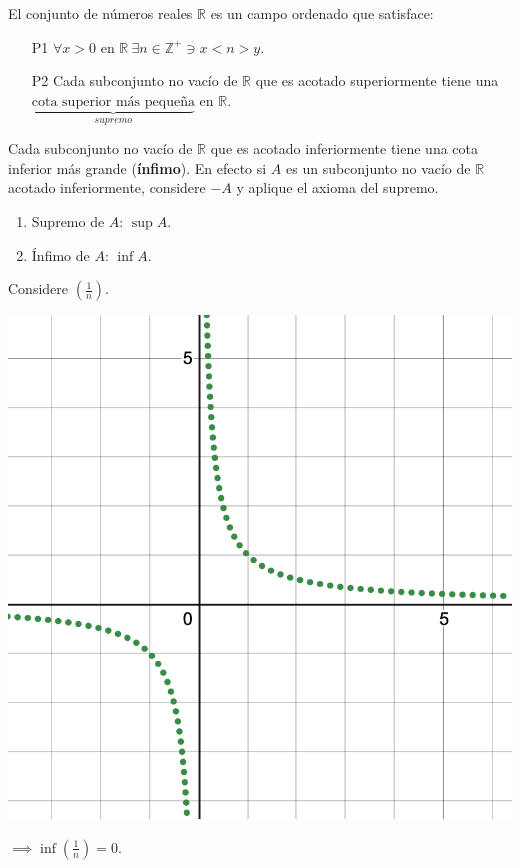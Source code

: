 \begin{definicion}
	El conjunto de números reales $\mathbb{R}$ es un campo ordenado que satisface: 
	\begin{enumerate}
		\item[P1] $\forall x>0$ en $\mathbb{R}\ \exists n \in \mathbb{Z}^+ \ni x<n>y$.
		\item[P2] Cada subconjunto no vacío de $\mathbb{R}$ que es acotado superiormente tiene una $\underbrace{\text{cota superior más pequeña}}_{supremo}$ en $\mathbb{R}$. 
	\end{enumerate}
\end{definicion}

\begin{nota}
	Cada subconjunto no vacío de $\mathbb{R}$ que es acotado inferiormente tiene una cota inferior más grande (\textbf{ínfimo}). En efecto si $A$ es un subconjunto no vacío de $\mathbb{R}$ acotado inferiormente, considere $-A$ y aplique el axioma del supremo.
	
	\begin{cajita}
		\begin{enumerate}
			\item Supremo de $A$: $\sup A$. 
			\item Ínfimo de $A$: $\inf A$.
				\end{enumerate}
	\end{cajita}
\end{nota}

\begin{ejemplo}
	\item Considere $\left(\frac{1}{n}\right)$. 
	\begin{center}
		\includegraphics[scale=0.2]{images/1/unovern.png}
	\end{center}
$\implies \inf\left(\frac{1}{n}\right)=0$. 
\end{ejemplo}

